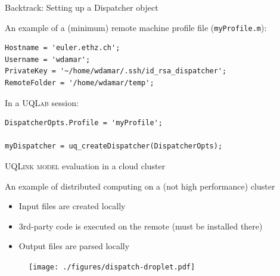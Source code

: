 \documentclass[]{rsuqbeamernew}
\begin{document}
\begin{frame}[fragile]{Backtrack: Setting up a Dispatcher object}

  

An example of a (minimum) remote machine profile file (\texttt{myProfile.m}):
\begin{lstlisting}[basicstyle=\scriptsize]
Hostname = 'euler.ethz.ch';
Username = 'wdamar';
PrivateKey = '~/home/wdamar/.ssh/id_rsa_dispatcher';
RemoteFolder = '/home/wdamar/temp';
\end{lstlisting}
  
In a \textsc{UQLab} session:
\begin{lstlisting}[basicstyle=\scriptsize,numbers=none]
DispatcherOpts.Profile = 'myProfile';
  
myDispatcher = uq_createDispatcher(DispatcherOpts);
\end{lstlisting}
  
\end{frame}

\begin{frame}[fragile]{\textsc{UQLink} \textsc{model} evaluation in a cloud cluster}

An example of distributed computing on a ({\altx not} high performance) cluster 
\begin{itemize}
  \item Input files are created locally
  \item 3rd-party code is executed on the remote (must be installed there) 
  \item Output files are parsed locally
\end{itemize}

\begin{figure}[htbp]
  \centering
  \texttt{[image: ./figures/dispatch-droplet.pdf]}
\end{figure}
    
\end{frame}
\end{document}
